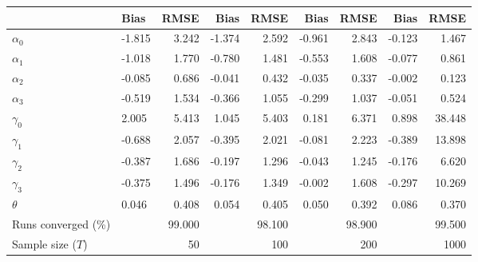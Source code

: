 
\begin{tabular}[t]{llrrrrrrr}
\toprule
  & Bias & RMSE & Bias & RMSE & Bias & RMSE & Bias & RMSE\\
\midrule
$\alpha_{0}$ & -1.815 & 3.242 & -1.374 & 2.592 & -0.961 & 2.843 & -0.123 & 1.467\\
$\alpha_{1}$ & -1.018 & 1.770 & -0.780 & 1.481 & -0.553 & 1.608 & -0.077 & 0.861\\
$\alpha_{2}$ & -0.085 & 0.686 & -0.041 & 0.432 & -0.035 & 0.337 & -0.002 & 0.123\\
$\alpha_{3}$ & -0.519 & 1.534 & -0.366 & 1.055 & -0.299 & 1.037 & -0.051 & 0.524\\
$\gamma_{0}$ & 2.005 & 5.413 & 1.045 & 5.403 & 0.181 & 6.371 & 0.898 & 38.448\\
$\gamma_{1}$ & -0.688 & 2.057 & -0.395 & 2.021 & -0.081 & 2.223 & -0.389 & 13.898\\
$\gamma_{2}$ & -0.387 & 1.686 & -0.197 & 1.296 & -0.043 & 1.245 & -0.176 & 6.620\\
$\gamma_{3}$ & -0.375 & 1.496 & -0.176 & 1.349 & -0.002 & 1.608 & -0.297 & 10.269\\
$\theta$ & 0.046 & 0.408 & 0.054 & 0.405 & 0.050 & 0.392 & 0.086 & 0.370\\
Runs converged (\%) &  & 99.000 &  & 98.100 &  & 98.900 &  & 99.500\\
Sample size ($T$) &  & 50 &  & 100 &  & 200 &  & 1000\\
\bottomrule
\end{tabular}
